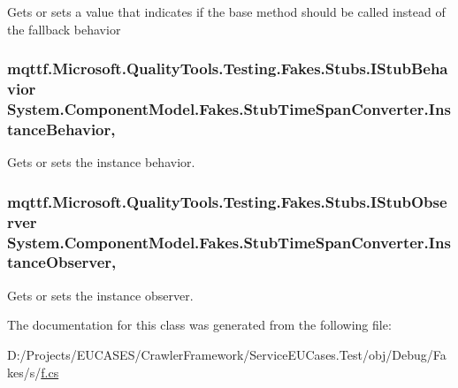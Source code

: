 Gets or sets a value that indicates if the base method should be called instead of the fallback behavior

\hypertarget{class_system_1_1_component_model_1_1_fakes_1_1_stub_time_span_converter_a845c76dc8e6d5c7477f9f3c482f76efc}{
\subsubsection[{Instance\-Behavior}]{\setlength{\rightskip}{0pt plus 5cm}mqttf.\-Microsoft.\-Quality\-Tools.\-Testing.\-Fakes.\-Stubs.\-I\-Stub\-Behavior System.\-Component\-Model.\-Fakes.\-Stub\-Time\-Span\-Converter.\-Instance\-Behavior\hspace{0.3cm}{\ttfamily [get]}, {\ttfamily [set]}}}\label{class_system_1_1_component_model_1_1_fakes_1_1_stub_time_span_converter_a845c76dc8e6d5c7477f9f3c482f76efc}


Gets or sets the instance behavior.

\hypertarget{class_system_1_1_component_model_1_1_fakes_1_1_stub_time_span_converter_a0dbfcc7bd674bacdc7de551759db739d}{
\subsubsection[{Instance\-Observer}]{\setlength{\rightskip}{0pt plus 5cm}mqttf.\-Microsoft.\-Quality\-Tools.\-Testing.\-Fakes.\-Stubs.\-I\-Stub\-Observer System.\-Component\-Model.\-Fakes.\-Stub\-Time\-Span\-Converter.\-Instance\-Observer\hspace{0.3cm}{\ttfamily [get]}, {\ttfamily [set]}}}\label{class_system_1_1_component_model_1_1_fakes_1_1_stub_time_span_converter_a0dbfcc7bd674bacdc7de551759db739d}


Gets or sets the instance observer.



The documentation for this class was generated from the following file\-:\begin{DoxyCompactItemize}
\item 
D\-:/\-Projects/\-E\-U\-C\-A\-S\-E\-S/\-Crawler\-Framework/\-Service\-E\-U\-Cases.\-Test/obj/\-Debug/\-Fakes/s/\hyperlink{s_2f_8cs}{f.\-cs}\end{DoxyCompactItemize}
